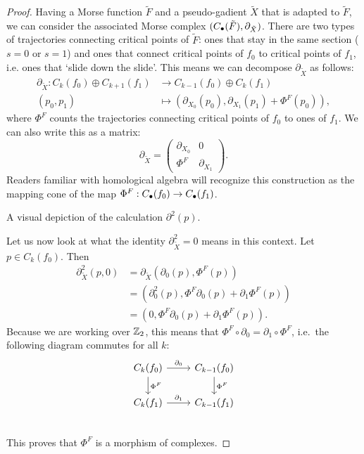 \begin{proof}
Having a Morse function $\tilde{F}$ and a pseudo-gadient $\tilde{X}$ that is adapted to $\tilde{F}$, we can consider the associated Morse complex $(C_\bullet(\tilde{F}), \partial_{\tilde{X}})$.
There are two types of trajectories connecting critical points of $\tilde{F}$: ones that stay in the same section ($s = 0$ or $s = 1$)  and ones that connect critical points of $f_0$ to critical points of $f_1$, i.e. ones that `slide down the slide'.
This means we can decompose $\partial_{\tilde{X}}$ as follows:
\begin{align*}
    \partial_{\tilde{X}}: C_k(f_0) \oplus C_{k+1}(f_1) &\longrightarrow C_{k-1}(f_0) \oplus C_k(f_1) \\
    (p_0, p_1) &\longmapsto (\partial_{X_0}(p_0), \partial_{X_1}(p_1)+ \Phi^{F}(p_0))
,\end{align*}
where $\Phi^{F}$ counts the trajectories connecting critical points of $f_0$ to ones of $f_1$. We can also write this as a matrix:
\[
\partial_{\tilde{X}} = \begin{pmatrix}
    \partial_{X_0} & 0 \\
     \Phi^{F}& \partial_{X_1}
\end{pmatrix}
.\] 
Readers familiar with homological algebra will recognize this construction as the mapping cone of the map $\Phi^{F}: C_\bullet(f_0) \to  C_\bullet(f_1)$.

\begin{marginfigure}
    \centering
    \caption{A visual depiction of the calculation $\partial^2(p)$.}
    \label{fig:morse-homology-independence-partial-squared-zero}
\end{marginfigure}

Let us now look at what the identity $\partial_{\tilde{X}}^2 = 0$ means in this context. Let $p \in C_k(f_0)$.
Then
\begin{align*}
    \partial_{\tilde{X}}^2 (p, 0) &= \partial_{\tilde{X}}(\partial_{0}(p),  \Phi^{F}(p))\\
                                                      &= (\partial_0^2(p), \Phi^{F}\partial_0(p)+ \partial_1 \Phi^{F}(p))\\
                                                    &= (0, \Phi^{F}\partial_0(p)+ \partial_1 \Phi^{F}(p))
.\end{align*} 
Because we are working over $\mathbb{Z}_2$, this means that $\Phi^{F}  \circ  \partial_0 = \partial_1  \circ  \Phi^{F}$, i.e.\ the following diagram commutes for all $k$:
\[
    \begin{tikzcd}
        C_k(f_0) \arrow[d, "\Phi^{F}"]\arrow[r, "\partial_0"] &C_{k-1}(f_0) \arrow[d, "\Phi^{F}"]\\
        C_k(f_1) \arrow[r, "\partial_1"] &C_{k-1}(f_1)\\
    \end{tikzcd}
\]
This proves that $\Phi^{F}$ is a morphism of complexes.


\end{proof}
